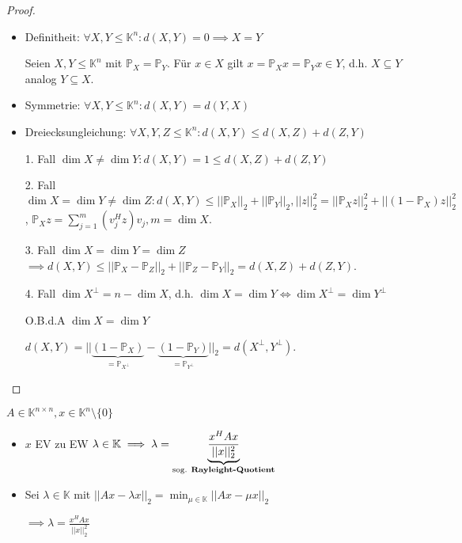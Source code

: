 \begin{proof}
	\begin{itemize}
		\item Definitheit: $\forall X,Y \leq \mathbb{K}^n: d(X,Y) = 0 \implies X=Y$
		
		Seien $X,Y \leq \mathbb{K}^n$ mit $\mathbb{P}_X = \mathbb{P}_Y$. Für $x \in X$ gilt $x = \mathbb{P}_Xx = \mathbb{P}_Yx \in Y$, d.h. $X \subseteq Y$ analog $Y \subseteq X$.
		
		\item Symmetrie: $\forall X,Y \leq \mathbb{K}^n: d(X,Y) = d(Y,X)$
		
		\item Dreiecksungleichung: $\forall X,Y,Z \leq \mathbb{K}^n: d(X,Y) \leq d(X,Z) + d(Z,Y)$
		
		1. Fall $\dim X \neq \dim Y: d(X,Y) = 1 \leq d(X,Z) + d(Z,Y)$
		
		2. Fall $\dim X = \dim Y \neq \dim Z: d(X,Y) \leq ||\mathbb{P}_X||_2 + ||\mathbb{P}_Y||_2, ||z||_2^2 = ||\mathbb{P}_Xz||_2^2 + ||(1-\mathbb{P}_X)z||_2^2$, $\mathbb{P}_Xz = \sum_{j=1}^{m}(v_j^Hz)v_j, m = \dim X$.
		
		3. Fall $\dim X = \dim Y = \dim Z$ $\implies d(X,Y) \leq ||\mathbb{P}_X - \mathbb{P}_Z||_2 + ||\mathbb{P}_Z - \mathbb{P}_Y||_2 = d(X,Z) + d(Z,Y)$.
		
		4. Fall $\dim X^\perp = n - \dim X$, d.h. $\dim X = \dim Y \iff \dim X^\perp = \dim Y^\perp$
		
		O.B.d.A $\dim X = \dim Y$
		
		$d(X,Y) = ||\underbrace{(1-\mathbb{P}_X)}_{=\mathbb{P}_{X^\perp}} - \underbrace{(1- \mathbb{P}_Y)}_{=\mathbb{P}_{Y^\perp}}||_2 = d(X^\perp, Y^\perp).$
	\end{itemize}
\end{proof}

\begin{lemma}
	$A \in \mathbb{K}^{n\times n}, x \in \mathbb{K}^n\setminus\{0\}$
	\begin{itemize}
		\item $x$ EV zu EW $\lambda \in \mathbb{K} \implies \lambda = \underbrace{\frac{x^HAx}{||x||_2^2}}_{\text{sog. \textbf{Rayleight-Quotient}}}$
		\item Sei $\lambda \in \mathbb{K}$ mit $||Ax - \lambda x||_2 = \min_{\mu \in \mathbb{K}} ||Ax - \mu x||_2$
		
		$\implies \lambda = \frac{x^HAx}{||x||_2^2}$
	\end{itemize}
\end{lemma}

